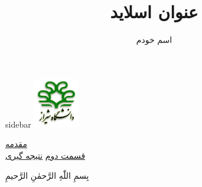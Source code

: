 \documentclass[11pt,oneside]{bidipresentation}
\title{عنوان اسلاید}
\author{اسم خودم}
\begin{document}
\begin{staticcontents*}{sidebar}
	\hspace{3mm}\includegraphics[width=2cm]{logo.png}%
	\begin{center}
		\color{sidebar-text}
		\begin{footnotesize}
		\bfseries\makeatletter\@title\makeatother
		\vskip 5mm
		\rm\makeatletter\@author\makeatother
		\end{footnotesize}
	\end{center}	
	\begin{center}
		\begin{small}
		\vskip 4cm
		\hyperref[sec:Intro]{مقدمه}
		\\
		\hyperref[sec:section2]{قسمت دوم}
		\vskip 4cm
	\hyperref[sec:Conc]{نتیجه گیری}
		\vspace{1.5cm}
		\end{small}		
	\end{center}
\end{staticcontents*}


\begin{titlepage}
\begin{center}
\begin{Large}
\vspace{5cm}
بِسمِ اللّٰهِ الرَّحمٰنِ الرَّحیمِ
\end{Large}
\end{center}
\end{titlepage}
\end{document}
